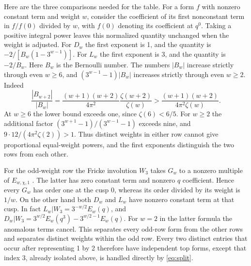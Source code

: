 \documentclass[11pt,a4paper]{article}
\theoremstyle{definition}
\theoremstyle{remark}
\numberwithin{equation}{section}
\begin{document}
Here are the three comparisons needed for the table. For a form $f$ with nonzero constant term and weight $w$, consider the coefficient of its first nonconstant term in $f/f(0)$ divided by $w$, with $f(0)$ denoting its coefficient at $q^0$. Taking a positive integral power leaves this normalized quantity unchanged when the weight is adjusted. For $D_w$ the first exponent is 1, and the quantity is $-2/[B_w(1-3^{w-1})]$. For $L_w$ the first exponent is 3, and the quantity is $-2/B_w$. Here $B_w$ is the Bernoulli number. The numbers $|B_w|$ increase strictly through even $w\ge6$, and $(3^{w-1}-1)|B_w|$ increases strictly through even $w\ge2$. Indeed
\[
 \frac{|B_{w+2}|}{|B_w|}
 =\frac{(w+1)(w+2)}{4\pi^2}\frac{\zeta(w+2)}{\zeta(w)}
 >\frac{(w+1)(w+2)}{4\pi^2\zeta(w)}.
\]
At $w\ge6$ the lower bound exceeds one, since $\zeta(6)<6/5$.
For $w\ge2$ the additional factor $(3^{w+1}-1)/(3^{w-1}-1)$ exceeds nine, and $9\cdot12/(4\pi^2\zeta(2))>1$. Thus distinct weights in either row cannot give proportional equal-weight powers, and the first exponents distinguish the two rows from each other.

For the odd-weight row the Fricke involution $W_3$ takes $G_w$ to a nonzero multiple of $E_{w,\chi,1}$ \cite[Cor.~4.4]{EKS}. The latter has zero constant term and nonzero $q$ coefficient. Hence every $G_w$ has order one at the cusp $0$, whereas its order divided by its weight is $1/w$. On the other hand both $D_w$ and $L_w$ have nonzero constant term at that cusp. In fact $L_w|W_3=3^{-w/2}E_w(q)$, and $D_w|W_3=3^{w/2}E_w(q^3)-3^{w/2-1}E_w(q)$. For $w=2$ in the latter formula the anomalous terms cancel. This separates every odd-row form from the other rows and separates distinct weights within the odd row. Every two distinct entries that occur after representing 1 by 2 therefore have independent top forms, except that index 3, already isolated above, is handled directly by \eqref{eq:split}.
\end{document}
